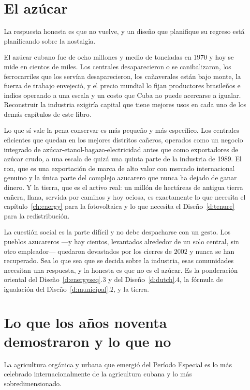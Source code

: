 \section{El azúcar}

La respuesta honesta es que no vuelve, y un diseño que planifique su regreso está planificando
sobre la nostalgia.

El azúcar cubano fue de ocho millones y medio de toneladas en 1970 y hoy se mide en cientos de
miles. Los centrales desaparecieron o se canibalizaron, los ferrocarriles que los servían
desaparecieron, los cañaverales están bajo monte, la fuerza de trabajo envejeció, y el precio
mundial lo fijan productores brasileños e indios operando a una escala y un costo que Cuba no
puede acercarse a igualar. Reconstruir la industria exigiría capital que tiene mejores usos en
cada uno de los demás capítulos de este libro.

Lo que sí vale la pena conservar es más pequeño y más específico. Los centrales eficientes que
quedan en los mejores distritos cañeros, operados como un negocio integrado de
azúcar-etanol-bagazo-electricidad antes que como exportadores de azúcar crudo, a una escala de
quizá una quinta parte de la industria de 1989. El ron, que es una exportación de marca de alto
valor con mercado internacional genuino y la única parte del complejo azucarero que nunca ha
dejado de ganar dinero. Y la tierra, que es el activo real: un millón de hectáreas de antigua
tierra cañera, llana, servida por caminos y hoy ociosa, es exactamente lo que necesita el
capítulo~\ref{ch:energy} para la fotovoltaica y lo que necesita el Diseño~\ref{d:tenure} para
la redistribución.

La cuestión social es la parte difícil y no debe despacharse con un gesto. Los pueblos
azucareros ---y hay cientos, levantados alrededor de un solo central, sin otro empleador---
quedaron devastados por los cierres de 2002 y nunca se han recuperado. Sea lo que sea que se
decida sobre la industria, esas comunidades necesitan una respuesta, y la honesta es que no es
el azúcar. Es la ponderación oriental del Diseño~\ref{d:energyseq}.3 y del
Diseño~\ref{d:dutch}.4, la fórmula de igualación del Diseño~\ref{d:municipal}.2, y la tierra.

\section{Lo que los años noventa demostraron y lo que no}

La agricultura orgánica y urbana que emergió del Período Especial es lo más celebrado
internacionalmente de la agricultura cubana y lo más sobredimensionado.

